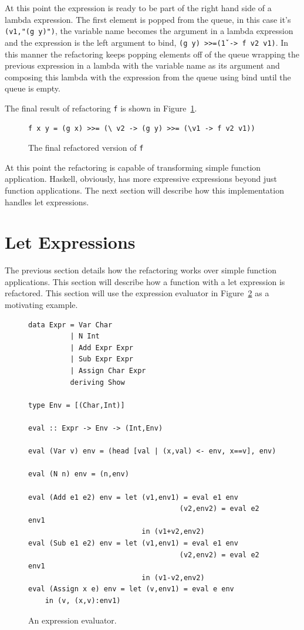At this point the expression is ready to be part of the right hand side of a lambda expression. The first element is popped from the queue, in this case it's \texttt{(v1,"(g y)")}, the variable name becomes the argument in a lambda expression and the expression is the left argument to bind, \texttt{(g y) >>=(\v1 -> f v2 v1)}. In this manner the refactoring keeps popping elements off of the queue wrapping the previous expression in a lambda with the variable name as its argument and composing this lambda with the expression from the queue using bind until the queue is empty.

The final result of refactoring \texttt{f} is shown in Figure~\ref{simpF_ref}.

\begin{figure}[t]
\begin{lstlisting}
f x y = (g x) >>= (\ v2 -> (g y) >>= (\v1 -> f v2 v1))
\end{lstlisting}
\caption{The final refactored version of \texttt{f}}
\label{simpF_ref}
\end{figure}

At this point the refactoring is capable of transforming simple function application. Haskell, obviously, has more expressive expressions beyond just function applications. The next section will describe how this implementation handles let expressions.

\section{Let Expressions}

The previous section details how the refactoring works over simple function applications. This section will describe how a function with a let expression is refactored. This section will use the expression evaluator in Figure~\ref{evalExpr} as a motivating example.

\begin{figure}[t]
\begin{lstlisting}
data Expr = Var Char
          | N Int
          | Add Expr Expr
          | Sub Expr Expr
          | Assign Char Expr
          deriving Show

type Env = [(Char,Int)]

eval :: Expr -> Env -> (Int,Env)

eval (Var v) env = (head [val | (x,val) <- env, x==v], env)

eval (N n) env = (n,env)

eval (Add e1 e2) env = let (v1,env1) = eval e1 env
                                    (v2,env2) = eval e2 env1 
                           in (v1+v2,env2)
eval (Sub e1 e2) env = let (v1,env1) = eval e1 env
                                    (v2,env2) = eval e2 env1 
                           in (v1-v2,env2)
eval (Assign x e) env = let (v,env1) = eval e env 
	in (v, (x,v):env1)
\end{lstlisting}
\caption{An expression evaluator.}
\label{evalExpr}
\end{figure}

